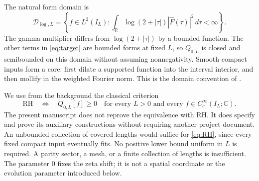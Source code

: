 \documentclass[11pt]{article}
\numberwithin{equation}{section}
\theoremstyle{definition}
\theoremstyle{remark}
\newcommand{\R}{\mathbb R}
\newcommand{\C}{\mathbb C}
\begin{document}
The natural form domain is
\begin{equation}
 \mathcal D_{\log,L}=
 \left\{f\in L^2(I_L):\int_\R\log(2+|\tau|)
 |\widehat F(\tau)|^2\,d\tau<\infty\right\}.
 \label{eq:domain}
\end{equation}
The gamma multiplier differs from $\log(2+|\tau|)$ by a bounded function. The other terms in \eqref{eq:target} are bounded forms at fixed $L$, so $Q_{0,L}$ is closed and semibounded on this domain without assuming nonnegativity. Smooth compact inputs form a core: first dilate a supported function into the interval interior, and then mollify in the weighted Fourier norm. This is the domain convention of \cite{background}.

We use from the background the classical criterion
\begin{equation}
 \mathrm{RH}\quad\Longleftrightarrow\quad
 Q_{0,L}[f]\ge0\quad\text{for every }L>0
 \text{ and every }f\in C_c^\infty(I_L;\C).
 \label{eq:RH}
\end{equation}
The present manuscript does not reprove the equivalence with RH. It does specify and prove its auxiliary constructions without requiring another project document. An unbounded collection of covered lengths would suffice for \eqref{eq:RH}, since every fixed compact input eventually fits. No positive lower bound uniform in $L$ is required. A parity sector, a mesh, or a finite collection of lengths is insufficient. The parameter $0$ fixes the zeta shift; it is not a spatial coordinate or the evolution parameter introduced below.
\end{document}
